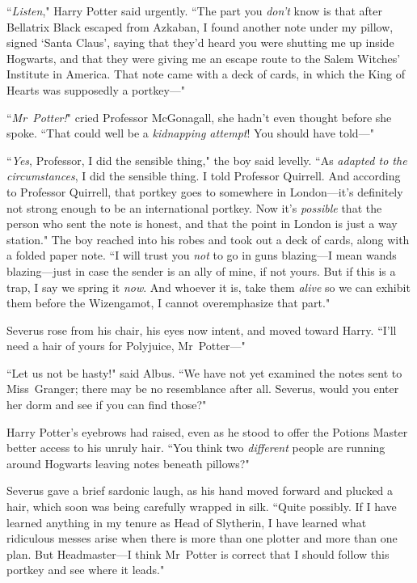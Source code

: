 ``\emph{Listen}," Harry Potter said urgently. ``The part you \emph{don't} know is that after Bellatrix Black escaped from Azkaban, I found another note under my pillow, signed `Santa Claus', saying that they'd heard you were shutting me up inside Hogwarts, and that they were giving me an escape route to the Salem Witches' Institute in America. That note came with a deck of cards, in which the King of Hearts was supposedly a portkey—"

``\emph{Mr~Potter!}" cried Professor McGonagall, she hadn't even thought before she spoke. ``That could well be a \emph{kidnapping attempt}! You should have told—"

``\emph{Yes}, Professor, I did the sensible thing," the boy said levelly. ``As \emph{adapted to the circumstances}, I did the sensible thing. I told Professor Quirrell. And according to Professor Quirrell, that portkey goes to somewhere in London—it's definitely not strong enough to be an international portkey. Now it's \emph{possible} that the person who sent the note is honest, and that the point in London is just a way station." The boy reached into his robes and took out a deck of cards, along with a folded paper note. ``I will trust you \emph{not} to go in guns blazing—I mean wands blazing—just in case the sender is an ally of mine, if not yours. But if this is a trap, I say we spring it \emph{now}. And whoever it is, take them \emph{alive} so we can exhibit them before the Wizengamot, I cannot overemphasize that part."

Severus rose from his chair, his eyes now intent, and moved toward Harry. ``I'll need a hair of yours for Polyjuice, Mr~Potter—"

``Let us not be hasty!" said Albus. ``We have not yet examined the notes sent to Miss~Granger; there may be no resemblance after all. Severus, would you enter her dorm and see if you can find those?"

Harry Potter's eyebrows had raised, even as he stood to offer the Potions Master better access to his unruly hair. ``You think two \emph{different} people are running around Hogwarts leaving notes beneath pillows?"

Severus gave a brief sardonic laugh, as his hand moved forward and plucked a hair, which soon was being carefully wrapped in silk. ``Quite possibly. If I have learned anything in my tenure as Head of Slytherin, I have learned what ridiculous messes arise when there is more than one plotter and more than one plan. But Headmaster—I think Mr~Potter is correct that I should follow this portkey and see where it leads."

